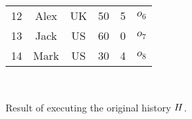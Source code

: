 \begin{figure}[t]
\begin{minipage}{1\linewidth}
{\begin{minipage}{1.5\columnwidth}
\begin{tabular}{|c|c|c|c|c|l}
                                                                                                                          12                                                                                                                 & Alex             & UK              & 50            & 5                   & $o_6$ \\
                                                                                                                                                                                  13                                                         & Jack             & US              & 60            & 0                   & $o_7$                                                          \\
                                                                                                                                                                                                                                          14 & Mark             & US              & 30            & 4                   & $o_8$                                                           \\ \cline{1-5}
        \end{tabular}
      \end{minipage}
    }                                                                                                                                                     \\[-3mm]
    \caption{Result of  executing the original history $H$.}
    \label{fig:updated-example-instance}
  \end{minipage}

\end{figure}
